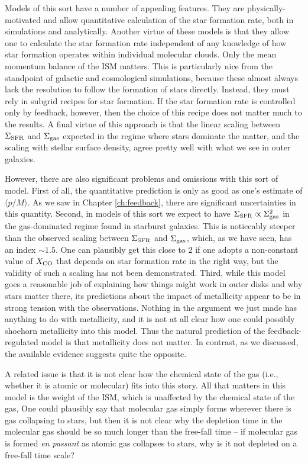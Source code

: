 Models of this sort have a number of appealing features. They are physically-motivated and allow quantitative calculation of the star formation rate, both in simulations and analytically. Another virtue of these models is that they allow one to calculate the star formation rate independent of any knowledge of how star formation operates within individual molecular clouds. Only the mean momentum balance of the ISM matters. This is particularly nice from the standpoint of galactic and cosmological simulations, because these almost always lack the resolution to follow the formation of stars directly. Instead, they must rely in subgrid recipes for star formation. If the star formation rate is controlled only by feedback, however, then the choice of this recipe does not matter much to the results. A final virtue of this approach is that the linear scaling between $\Sigma_{\rm SFR}$ and $\Sigma_{\rm gas}$ expected in the regime where stars dominate the matter, and the scaling with stellar surface density, agree pretty well with what we see in outer galaxies.

However, there are also significant problems and omissions with this sort of model. First of all, the quantitative prediction is only as good as one's estimate of $\langle p/M\rangle$. As we saw in Chapter \ref{ch:feedback}, there are significant uncertainties in this quantity. Second, in models of this sort we expect to have $\Sigma_{\rm SFR} \propto \Sigma_{\rm gas}^2$ in the gas-dominated regime found in starburst galaxies. This is noticeably steeper than the observed scaling between $\Sigma_{\rm SFR}$ and $\Sigma_{\rm gas}$, which, as we have seen, has an index $\sim 1.5$. One can plausibly get this close to 2 if one adopts a non-constant value of $X_{\rm CO}$ that depends on star formation rate in the right way, but the validity of such a scaling has not been demonstrated. Third, while this model goes a reasonable job of explaining how things might work in outer disks and why stars matter there, its predictions about the impact of metallicity appear to be in strong tension with the observations. Nothing in the argument we just made has anything to do with metallicity, and it is not at all clear how one could possibly shoehorn metallicity into this model. Thus the natural prediction of the feedback-regulated model is that metallicity does not matter. In contrast, as we discussed, the available evidence suggests quite the opposite.

A related issue is that it is not clear how the chemical state of the gas (i.e., whether it is atomic or molecular) fits into this story. All that matters in this model is the weight of the ISM, which is unaffected by the chemical state of the gas, One could plausibly say that molecular gas simply forms wherever there is gas collapsing to stars, but then it is not clear why the depletion time in the molecular gas should be so much longer than the free-fall time -- if molecular gas is formed \textit{en passant} as atomic gas collapses to stars, why is it not depleted on a free-fall time scale?

